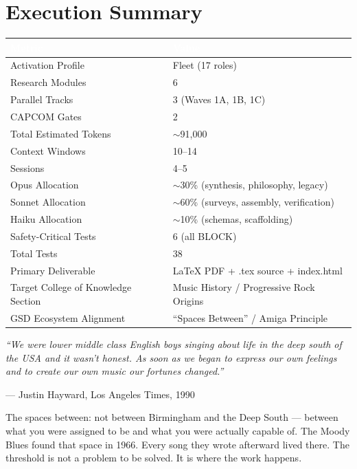 \documentclass[11pt,letterpaper]{article}
\newcommand{\tableheader}[1]{\textbf{\sffamily\textcolor{white}{#1}}}
\begin{document}
\section{Execution Summary}

\begin{center}
\begin{tabularx}{\textwidth}{L{5cm}X}
\toprule
{}
\tableheader{Metric} & \tableheader{Value} \\
\midrule
Activation Profile & Fleet (17 roles) \\
Research Modules & 6 \\
Parallel Tracks & 3 (Waves 1A, 1B, 1C) \\
CAPCOM Gates & 2 \\
Total Estimated Tokens & $\sim$91,000 \\
Context Windows & 10--14 \\
Sessions & 4--5 \\
Opus Allocation & $\sim$30\% (synthesis, philosophy, legacy) \\
Sonnet Allocation & $\sim$60\% (surveys, assembly, verification) \\
Haiku Allocation & $\sim$10\% (schemas, scaffolding) \\
Safety-Critical Tests & 6 (all BLOCK) \\
Total Tests & 38 \\
Primary Deliverable & LaTeX PDF + .tex source + index.html \\
Target College of Knowledge Section & Music History / Progressive Rock Origins \\
GSD Ecosystem Alignment & ``Spaces Between'' / Amiga Principle \\
\bottomrule
\end{tabularx}
\end{center}

\vspace{1.5em}
\begin{quotebox}
\textit{``We were lower middle class English boys singing about life in the deep south of the USA and it wasn't honest. As soon as we began to express our own feelings and to create our own music our fortunes changed.''}

\vspace{0.5em}
--- Justin Hayward, Los Angeles Times, 1990

\vspace{1em}
The spaces between: not between Birmingham and the Deep South --- between what you were assigned to be and what you were actually capable of. The Moody Blues found that space in 1966. Every song they wrote afterward lived there. The threshold is not a problem to be solved. It is where the work happens.
\end{quotebox}
\end{document}
